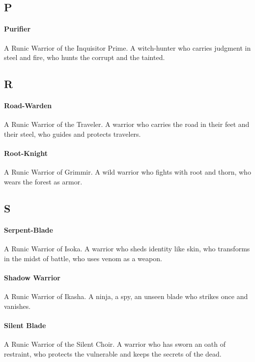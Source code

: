\subsection*{P}

\paragraph{Purifier}
A Runic Warrior of the Inquisitor Prime. A witch-hunter who carries judgment in steel and fire, who hunts the corrupt and the tainted.

\subsection*{R}

\paragraph{Road-Warden}
A Runic Warrior of the Traveler. A warrior who carries the road in their feet and their steel, who guides and protects travelers.

\paragraph{Root-Knight}
A Runic Warrior of Grimmir. A wild warrior who fights with root and thorn, who wears the forest as armor.

\subsection*{S}

\paragraph{Serpent-Blade}
A Runic Warrior of Isoka. A warrior who sheds identity like skin, who transforms in the midst of battle, who uses venom as a weapon.

\paragraph{Shadow Warrior}
A Runic Warrior of Ikasha. A ninja, a spy, an unseen blade who strikes once and vanishes.

\paragraph{Silent Blade}
A Runic Warrior of the Silent Choir. A warrior who has sworn an oath of restraint, who protects the vulnerable and keeps the secrets of the dead.

